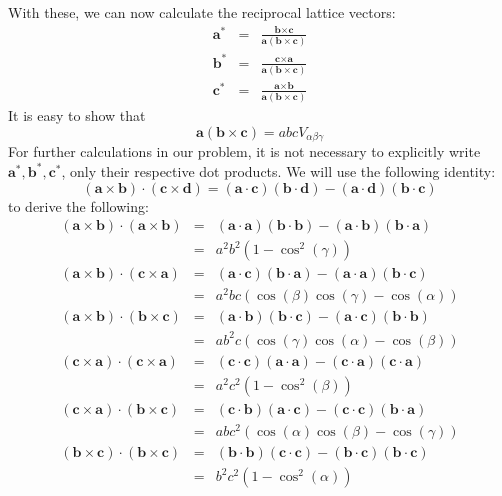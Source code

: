 \documentclass[prb]{revtex4}%
\begin{document}
With these, we can now calculate the reciprocal lattice vectors:
\begin{eqnarray}
  \textbf{a}^* &=& \frac{\textbf{b} \times \textbf{c}}{\textbf{a}(\textbf{b} \times \textbf{c})} \\
  \textbf{b}^* &=& \frac{\textbf{c} \times \textbf{a}}{\textbf{a}(\textbf{b} \times \textbf{c})}  \\
  \textbf{c}^* &=& \frac{\textbf{a} \times \textbf{b}}{\textbf{a}(\textbf{b} \times \textbf{c})}
\end{eqnarray}
It is easy to show that
\begin{equation}
    \textbf{a}(\textbf{b} \times \textbf{c}) = a b c V_{\alpha\beta\gamma}
\end{equation}
For further calculations in our problem, it is not necessary to explicitly write $\textbf{a}^*, \textbf{b}^*, \textbf{c}^*$, only their respective dot products. We will use the following identity:
\begin{equation}
    (\textbf{a} \times \textbf{b})\cdot(\textbf{c} \times \textbf{d}) = (\textbf{a}\cdot\textbf{c})(\textbf{b}\cdot\textbf{d}) -(\textbf{a}\cdot\textbf{d})(\textbf{b}\cdot\textbf{c})
\end{equation}
to derive the following:
\begin{eqnarray}
    \nonumber  (\textbf{a} \times \textbf{b})\cdot(\textbf{a} \times \textbf{b}) &=& (\textbf{a}\cdot\textbf{a})(\textbf{b}\cdot\textbf{b}) -(\textbf{a}\cdot\textbf{b})(\textbf{b}\cdot\textbf{a}) \\
    &=& a^2 b^2 (1-\cos^2(\gamma))  \\
    \nonumber  (\textbf{a} \times \textbf{b})\cdot(\textbf{c} \times \textbf{a}) &=& (\textbf{a}\cdot\textbf{c})(\textbf{b}\cdot\textbf{a}) -(\textbf{a}\cdot\textbf{a})(\textbf{b}\cdot\textbf{c}) \\
    &=&  a^2 b c (\cos(\beta) \cos(\gamma)-\cos(\alpha)) \\
    \nonumber  (\textbf{a} \times \textbf{b})\cdot(\textbf{b} \times \textbf{c}) &=& (\textbf{a}\cdot\textbf{b})(\textbf{b}\cdot\textbf{c}) -(\textbf{a}\cdot\textbf{c})(\textbf{b}\cdot\textbf{b}) \\
    &=&   a b^2 c (\cos(\gamma) \cos(\alpha) - \cos(\beta))\\
    \nonumber  (\textbf{c} \times \textbf{a})\cdot(\textbf{c} \times \textbf{a}) &=& (\textbf{c}\cdot\textbf{c})(\textbf{a}\cdot\textbf{a}) -(\textbf{c}\cdot\textbf{a})(\textbf{c}\cdot\textbf{a}) \\
    &=&  a^2 c^2 (1-\cos^2(\beta)) \\
    \nonumber  (\textbf{c} \times \textbf{a})\cdot(\textbf{b} \times \textbf{c}) &=& (\textbf{c}\cdot\textbf{b})(\textbf{a}\cdot\textbf{c}) -(\textbf{c}\cdot\textbf{c})(\textbf{b}\cdot\textbf{a}) \\
    &=&  a b c^2 (\cos(\alpha)\cos(\beta)-\cos(\gamma)) \\
    \nonumber  (\textbf{b} \times \textbf{c})\cdot(\textbf{b} \times \textbf{c}) &=& (\textbf{b}\cdot\textbf{b})(\textbf{c}\cdot\textbf{c}) -(\textbf{b}\cdot\textbf{c})(\textbf{b}\cdot\textbf{c}) \\
    &=& b^2 c^2 (1-\cos^2(\alpha))
\end{eqnarray}
\end{document}
